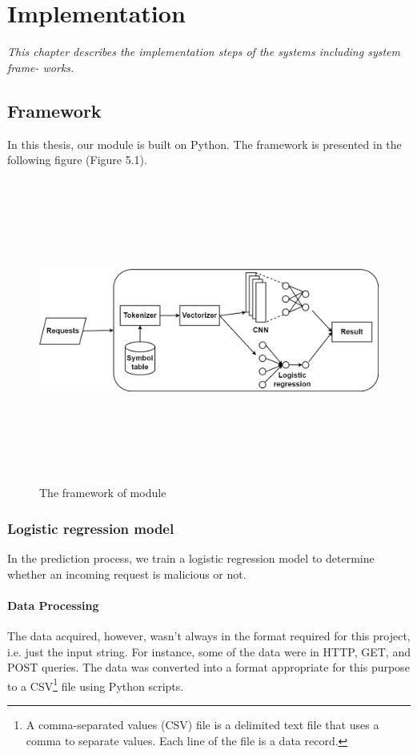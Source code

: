 \chapter{Implementation}
\label{chap:implementation}
	\textit{\hspace{0.5cm}This chapter describes the implementation steps of the systems including system frame- works.}
\minitoc


\section{Framework}
\label{sec:framework}
\hspace{0.5cm}In this thesis, our module is built on Python. The framework is presented in the following figure (Figure 5.1).

\begin{figure}[!h]
	\centering
	\includegraphics[width=\linewidth, height=10cm,keepaspectratio]{figures/Untitled Diagram.drawio (1).png}
  \caption{The framework of module}
\end{figure} 

\subsection{Logistic regression model}
\hspace{0.5cm}In the prediction process, we train a logistic regression model to determine whether an incoming request is malicious or not.
\subsubsection{Data Processing}
\hspace{0.5cm}The data acquired, however, wasn't always in the format required for this project, i.e. just the input string. For instance, some of the data were in HTTP, GET, and POST queries. The data was converted into a format appropriate for this purpose to a CSV\footnote{A comma-separated values (CSV) file is a delimited text file that uses a comma to separate values. Each line of the file is a data record.} file using Python scripts.
